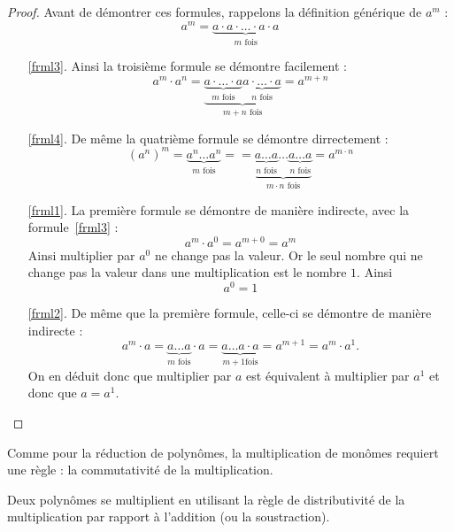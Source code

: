 \begin{proof}
Avant de démontrer ces formules, rappelons la définition générique de $a^m$ :
$$
a^m = \underbrace{a \cdot a \cdot \dots \cdot a \cdot a}_{m \mbox{ fois}}
$$
\begin{enumerate}
\item[\ref{frml3}.] Ainsi la troisième formule se démontre facilement :
$$
a^m \cdot a^n = \underbrace{\underbrace{a \cdot \dots \cdot a}_{m \mbox{ fois}} \underbrace{a \cdot \dots \cdot a}_{n \mbox{ fois}}}_{m+n \mbox{ fois}} = a^{m+n}
$$
\item[\ref{frml4}.] De même la quatrième formule se démontre dirrectement :
$$
\left(a^n\right)^m 	= \underbrace{a^n  \dots  a^n}_{m \mbox{ fois}} =
					= \underbrace{\underbrace{a  \dots a}_{n \mbox{ fois}} \dots \underbrace{a \dots a}_{n \mbox{ fois}}}_{m\cdot n \mbox{ fois}} = a^{m\cdot n}
$$
\item[\ref{frml1}.] La première formule se démontre de manière indirecte, avec la formule~\ref{frml3} :
$$
a^m \cdot a^0 = a^{m+0} = a^m
$$
Ainsi multiplier par $a^0$ ne change pas la valeur. Or le seul nombre qui ne change pas la valeur dans une multiplication est le nombre $1$. Ainsi
$$
a^0 = 1
$$
\item[\ref{frml2}.] De même que la première formule, celle-ci se démontre de manière indirecte :
$$
a^m \cdot a = \underbrace{a \dots a}_{m \mbox{ fois}} \cdot a = \underbrace{a \dots a \cdot a }_{m+1 \mbox{fois}} = a^{m+1} = a^m \cdot a^1.
$$
On en déduit donc que multiplier par $a$ est équivalent à multiplier par $a^1$ et donc que $a = a^1$.
\end{enumerate}
\end{proof}

\begin{remarque}
Comme pour la réduction de polynômes, la multiplication de monômes requiert une règle : la commutativité de la multiplication.
\end{remarque}

\begin{definition}
Deux polynômes se multiplient en utilisant la règle de distributivité de la multiplication par rapport à l'addition (ou la soustraction).
\end{definition}

